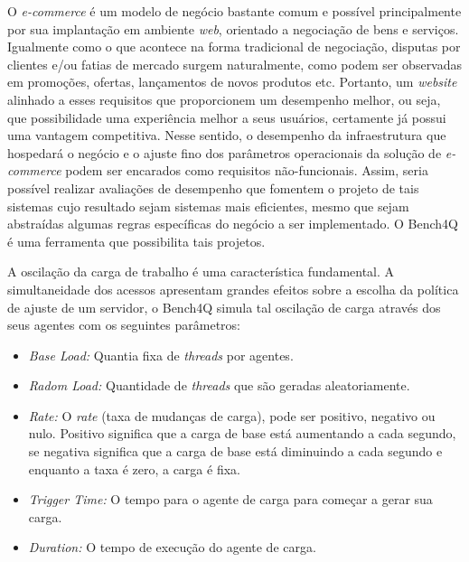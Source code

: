 O \textit{e-commerce} é um modelo de negócio bastante comum e possível principalmente por sua implantação em ambiente \textit{ web}, orientado a negociação de bens e serviços. Igualmente como o que acontece na forma tradicional de negociação, disputas por clientes e/ou fatias de mercado surgem naturalmente, como podem ser observadas em promoções, ofertas, lançamentos de novos produtos etc. Portanto, um \textit{ website} alinhado a esses requisitos que proporcionem um desempenho melhor, ou seja, que possibilidade uma experiência melhor a seus usuários, certamente já possui uma vantagem competitiva. Nesse sentido, o desempenho da infraestrutura que hospedará o negócio e o ajuste fino dos parâmetros operacionais da solução de \textit{e-commerce} podem ser encarados como requisitos não-funcionais. Assim, seria possível realizar avaliações de desempenho que fomentem o projeto de tais sistemas cujo resultado sejam sistemas mais eficientes, mesmo que sejam abstraídas algumas regras específicas do negócio a ser implementado. O Bench4Q é uma ferramenta que possibilita tais projetos.

A oscilação da carga de trabalho é uma característica fundamental. A simultaneidade dos acessos apresentam grandes efeitos sobre a escolha da política de ajuste de um servidor, o Bench4Q simula tal oscilação de carga através dos seus agentes com os seguintes parâmetros:

\begin{itemize}
	\item \textit{Base Load:} Quantia fixa de \textit{threads} por agentes.
	\item \textit{Radom Load:} Quantidade de \textit{threads} que são geradas aleatoriamente.
	\item \textit{Rate:} O \textit{rate} (taxa de mudanças de carga), pode ser positivo, negativo ou nulo. Positivo significa que a carga de base está aumentando a cada segundo, se negativa significa que a carga de base está diminuindo a cada segundo e enquanto a taxa é zero, a carga é fixa.
	\item \textit{Trigger Time:} O tempo para o agente de carga para começar a gerar sua carga.
	\item \textit{Duration:} O tempo de execução do agente de carga.
\end{itemize}

